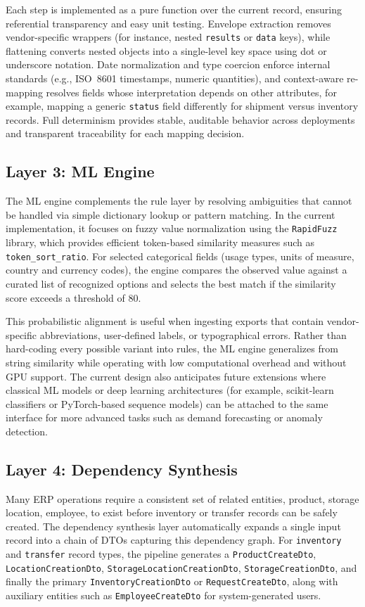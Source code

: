 \documentclass{article}
\begin{document}
Each step is implemented as a pure function over the current record, ensuring referential
transparency and easy unit testing.
Envelope extraction removes vendor-specific wrappers (for instance, nested \texttt{results} or
\texttt{data} keys), while flattening converts nested objects into a single-level key space
using dot or underscore notation.\autocite{doan2012principles}
Date normalization and type coercion enforce internal standards (e.g., ISO~8601 timestamps,
numeric quantities), and context-aware re-mapping resolves fields whose interpretation depends
on other attributes, for example, mapping a generic \texttt{status} field differently for
shipment versus inventory records.
Full determinism provides stable, auditable behavior across deployments and transparent
traceability for each mapping decision.

\subsection{Layer 3: ML Engine}
The ML engine complements the rule layer by resolving ambiguities that cannot be handled via
simple dictionary lookup or pattern matching.
In the current implementation, it focuses on fuzzy value normalization using the
\texttt{RapidFuzz} library, which provides efficient token-based similarity measures such as
\texttt{token\_sort\_ratio}.\autocite{rapidfuzz2020github,cran2024rapidfuzz}
For selected categorical fields (usage types, units of measure, country and currency codes),
the engine compares the observed value against a curated list of recognized options and selects
the best match if the similarity score exceeds a threshold of 80.

This probabilistic alignment is useful when ingesting exports that contain vendor-specific
abbreviations, user-defined labels, or typographical errors.
Rather than hard-coding every possible variant into rules, the ML engine generalizes from
string similarity while operating with low computational overhead and without GPU support.
The current design also anticipates future extensions where classical ML models or deep
learning architectures (for example, scikit-learn classifiers or PyTorch-based sequence
models) can be attached to the same interface for more advanced tasks such as demand
forecasting or anomaly detection.\autocite{dataforest2026integration}

\subsection{Layer 4: Dependency Synthesis}
Many ERP operations require a consistent set of related entities, product, storage location,
employee, to exist before inventory or transfer records can be safely created.
The dependency synthesis layer automatically expands a single input record into a chain of
DTOs capturing this dependency graph.
For \texttt{inventory} and \texttt{transfer} record types, the pipeline generates a
\texttt{ProductCreateDto}, \texttt{LocationCreationDto},
\texttt{StorageLocationCreationDto}, \texttt{StorageCreationDto}, and finally the primary
\texttt{InventoryCreationDto} or \texttt{RequestCreateDto}, along with auxiliary entities such
as \texttt{EmployeeCreateDto} for system-generated users.
\end{document}
